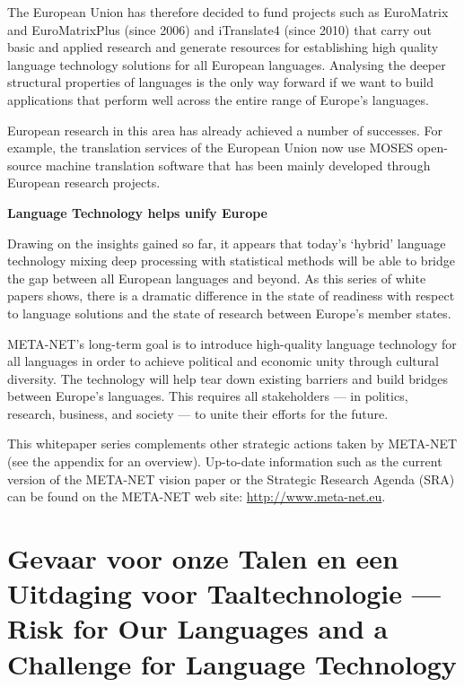\documentclass{scrartcl}
\newcommand{\boxtext}[1]{
  \begin{center}
    {\textbf{#1}}
  \end{center}
}
\begin{document}
\begin{Parallel}[c]{70mm}{70mm}
{    The European Union has therefore decided to fund projects such as EuroMatrix and EuroMatrixPlus (since 2006) and iTranslate4 (since 2010) that carry out basic and applied research and generate resources for establishing high quality language technology solutions for all European languages. Analysing the deeper structural properties of languages is the only way forward if we want to build applications that perform well across the entire range of Europe's languages.

    European research in this area has already achieved a number of successes. For example, the translation services of the European Union now use MOSES open-source machine translation software that has been mainly developed through European research projects. 


    \boxtext{Language Technology helps unify Europe}

    Drawing on the insights gained so far, it appears that today's `hybrid' language technology mixing deep processing with statistical methods will be able to bridge the gap between all European languages and beyond. As this series of white papers shows, there is a dramatic difference in the state of readiness with respect to language solutions and the state of research between Europe's member states. 

    META-NET's long-term goal is to introduce high-quality language technology for all languages in order to achieve political and economic unity through cultural diversity. The technology will help tear down existing barriers and build bridges between Europe's languages. This requires all stakeholders --- in politics, research, business, and society --- to unite their efforts for the future.

    This whitepaper series complements other strategic actions taken by META-NET (see the appendix for an overview). Up-to-date information such as the current version of the META-NET vision paper \cite{MNVision} or the Strategic Research Agenda (SRA) can be found on the META-NET web site: \url{http://www.meta-net.eu}.

  }

  \ParallelPar


  \section{Gevaar voor onze Talen en een Uitdaging voor Taaltechnologie --- Risk for Our Languages and a Challenge for Language Technology}


\end{Parallel}
\end{document}
